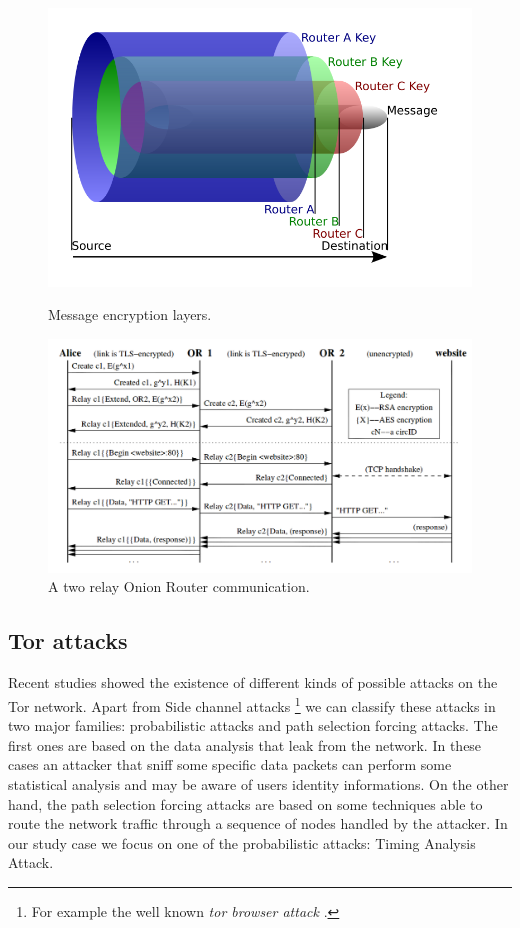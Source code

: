 \begin{figure}[H]
    \centering
    \includegraphics[scale=0.30]{onion.png}
    \caption{Message encryption layers.}
    \label{fig:onion}
    \includegraphics[scale=0.30]{or-communication.png}
    \caption{A two relay Onion Router communication.\cite{dingledine2004tor}}
\end{figure}

\subsection{Tor attacks}
Recent studies showed the existence of different kinds
of possible attacks on the Tor network. 
Apart from Side channel attacks \footnote{For example the well known \emph{tor browser attack }.
}
we can classify these attacks in
two major families: probabilistic attacks and path selection forcing attacks.
The first ones are based on the data analysis that leak from the network. 
In these cases an attacker that sniff some specific data packets can perform some 
statistical analysis and may be aware of users identity informations.
On the other hand, the path selection forcing attacks are based on some techniques 
able to route the network traffic through a sequence of nodes handled by the attacker.
In our study case we focus on one of the probabilistic attacks: Timing Analysis Attack.
 
